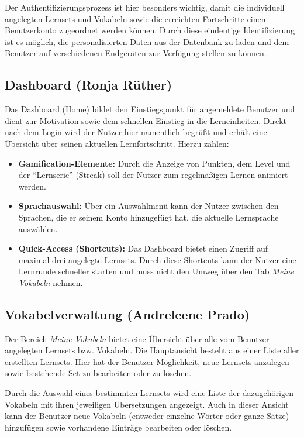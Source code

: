 Der Authentifizierungsprozess ist hier besonders wichtig, damit die individuell angelegten Lernsets und Vokabeln sowie die 
erreichten Fortschritte einem Benutzerkonto zugeordnet werden können. Durch diese eindeutige Identifizierung ist es möglich,
die personalisierten Daten aus der Datenbank zu laden und dem Benutzer auf verschiedenen Endgeräten zur Verfügung stellen 
zu können.

\subsection{Dashboard (Ronja Rüther)}
Das Dashboard (Home) bildet den Einstiegspunkt für angemeldete Benutzer und dient zur Motivation sowie dem schnellen Einstieg in die Lerneinheiten. 
Direkt nach dem Login wird der Nutzer hier namentlich begrüßt und erhält eine Übersicht über seinen aktuellen Lernfortschritt. Hierzu zählen:

\begin{itemize}
\item \textbf{Gamification-Elemente:} Durch die Anzeige von Punkten, dem Level und der \enquote{Lernserie} (Streak) soll der Nutzer zum regelmäßigen Lernen animiert werden.
\item \textbf{Sprachauswahl:} Über ein Auswahlmenü kann der Nutzer zwischen den Sprachen, die er seinem Konto hinzugefügt hat, die aktuelle Lernsprache auswählen.
\item \textbf{Quick-Access (Shortcuts):} Das Dashboard bietet einen Zugriff auf maximal drei angelegte Lernsets. Durch diese Shortcuts kann der Nutzer eine Lernrunde schneller starten und muss nicht den Umweg über den Tab \textit{Meine Vokabeln} nehmen.
\end{itemize}

\subsection{Vokabelverwaltung (Andreleene Prado)}
Der Bereich \textit{Meine Vokabeln} bietet eine Übersicht über alle vom Benutzer angelegten Lernsets bzw. Vokabeln. 
Die Hauptansicht besteht aus einer Liste aller erstellten Lernsets. Hier hat der Benutzer Möglichkeit, neue Lernsets anzulegen sowie bestehende Set zu bearbeiten oder zu löschen.

Durch die Auswahl eines bestimmten Lernsets wird eine Liste der dazugehörigen Vokabeln mit ihren jeweiligen Übersetzungen angezeigt.
Auch in dieser Ansicht kann der Benutzer neue Vokabeln (entweder einzelne Wörter oder ganze Sätze) hinzufügen sowie vorhandene Einträge bearbeiten oder löschen.

